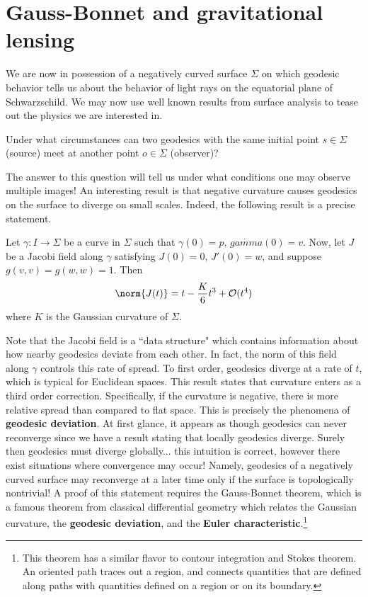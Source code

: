 \section{Gauss-Bonnet and gravitational lensing}
We are now in possession of a negatively curved surface $\Sigma$ on which geodesic behavior tells us about the behavior of light rays on the equatorial plane of Schwarzschild. We may now use well known results from surface analysis to tease out the physics we are interested in.
\begin{question}[]\label{}
Under what circumstances can two geodesics with the same initial point $s \in \Sigma$ (source) meet at another point $o \in \Sigma$ (observer)?
\end{question}
The answer to this question will tell us under what conditions one may observe multiple images! An interesting result is that negative curvature causes geodesics on the surface to diverge on small scales. Indeed, the following result is a precise statement.
\begin{theorem}[]\label{}
Let $\gamma: I \to \Sigma$ be a curve in $\Sigma$ such that $\gamma(0)=p$, $\dot{gamma}(0) = v$. Now, let $J$ be a Jacobi field along $\gamma$ satisfying $J(0)=0$, $J'(0)=w$, and suppose $g(v,v)=g(w,w)=1$. Then
\begin{equation}\label{}
\norm{J(t)} = t - \frac{K}{6}t^3 + \order(t^4)
\end{equation}
where $K$ is the Gaussian curvature of $\Sigma$.
\end{theorem}
Note that the Jacobi field is a ``data structure" which contains information about how nearby geodesics deviate from each other.
In fact, the norm of this field along $\gamma$ controls this rate of spread.
To first order, geodesics diverge at a rate of $t$, which is typical for Euclidean spaces.
This result states that curvature enters as a third order correction. Specifically, if the curvature is negative, there is more relative spread than compared to flat space.
This is precisely the phenomena of \textbf{geodesic deviation}.
At first glance, it appears as though geodesics can never reconverge since we have a result stating that locally geodesics diverge.
Surely then geodesics must diverge globally... this intuition is correct, however there exist situations where convergence may occur!
Namely, geodesics of a negatively curved surface may reconverge at a later time only if the surface is topologically nontrivial!
A proof of this statement requires the Gauss-Bonnet theorem, which is a famous theorem from classical differential geometry which relates the Gaussian curvature, the \textbf{geodesic deviation}, and the \textbf{Euler characteristic}.\footnote{This theorem has a similar flavor to contour integration and Stokes theorem. An oriented path traces out a region, and connects quantities that are defined along paths with quantities defined on a region or on its boundary.}
